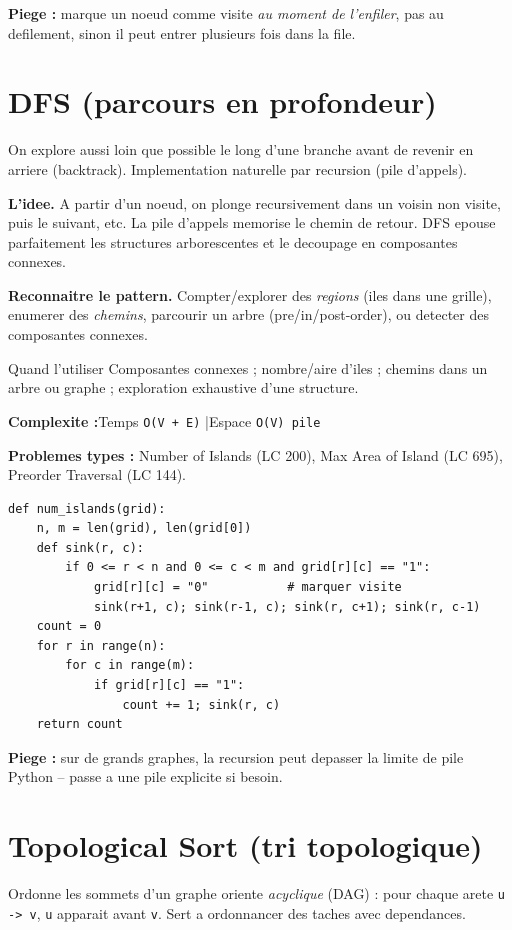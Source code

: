 \documentclass[11pt,a4paper]{article}
\newcommand{\complexite}[2]{%
  \noindent\textbf{Complexite :}\quad Temps \texttt{#1} \quad|\quad Espace \texttt{#2}\par\smallskip}
\newcommand{\leetcode}[1]{\noindent\textbf{Problemes types :} #1\par\medskip}
\begin{document}
\textbf{Piege :} marque un noeud comme visite \emph{au moment de l'enfiler}, pas au
defilement, sinon il peut entrer plusieurs fois dans la file.

\section{DFS (parcours en profondeur)}
On explore aussi loin que possible le long d'une branche avant de revenir en
arriere (backtrack). Implementation naturelle par recursion (pile d'appels).

\textbf{L'idee.} A partir d'un noeud, on plonge recursivement dans un voisin non
visite, puis le suivant, etc. La pile d'appels memorise le chemin de retour. DFS
epouse parfaitement les structures arborescentes et le decoupage en composantes
connexes.

\textbf{Reconnaitre le pattern.} Compter/explorer des \emph{regions} (iles dans
une grille), enumerer des \emph{chemins}, parcourir un arbre (pre/in/post-order),
ou detecter des composantes connexes.

\begin{infobox}{Quand l'utiliser}
Composantes connexes ; nombre/aire d'iles ; chemins dans un arbre ou graphe ;
exploration exhaustive d'une structure.
\end{infobox}

\complexite{O(V + E)}{O(V) pile}
\leetcode{Number of Islands (LC 200), Max Area of Island (LC 695), Preorder Traversal (LC 144).}

\begin{lstlisting}
def num_islands(grid):
    n, m = len(grid), len(grid[0])
    def sink(r, c):
        if 0 <= r < n and 0 <= c < m and grid[r][c] == "1":
            grid[r][c] = "0"           # marquer visite
            sink(r+1, c); sink(r-1, c); sink(r, c+1); sink(r, c-1)
    count = 0
    for r in range(n):
        for c in range(m):
            if grid[r][c] == "1":
                count += 1; sink(r, c)
    return count
\end{lstlisting}

\textbf{Piege :} sur de grands graphes, la recursion peut depasser la limite de
pile Python -- passe a une pile explicite si besoin.

\section{Topological Sort (tri topologique)}
Ordonne les sommets d'un graphe oriente \emph{acyclique} (DAG) : pour chaque arete
\texttt{u -> v}, \texttt{u} apparait avant \texttt{v}. Sert a ordonnancer des
taches avec dependances.
\end{document}
